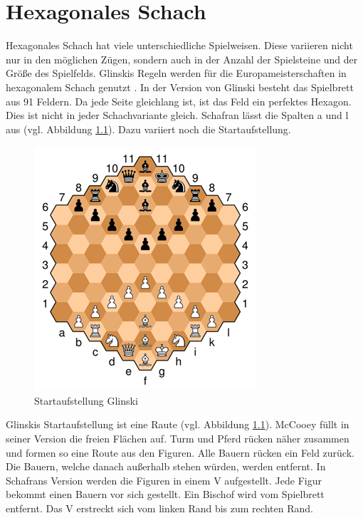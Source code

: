 \chapter{Hexagonales Schach}

Hexagonales Schach hat viele unterschiedliche Spielweisen. Diese variieren nicht nur in den möglichen Zügen, sondern auch in der Anzahl der Spielsteine und der Größe des Spielfelds. Glinskis Regeln werden für die Europameisterschaften in hexagonalem Schach genutzt \cite{Gados:Hexagonal}. In der Version von Glinski besteht das Spielbrett aus 91 Feldern. Da jede Seite gleichlang ist, ist das Feld ein perfektes Hexagon. Dies ist nicht in jeder Schachvariante gleich. Schafran lässt die Spalten a und l aus (vgl. Abbildung \ref{fig:hex:start}). Dazu variiert noch die Startaufstellung.

\begin{figure}[H]
    \centering
    \includegraphics{images/hexStart.png}
    \caption{Startaufstellung Glinski \protect\footnotemark}
    \label{fig:hex:start}
\end{figure}

Glinskis Startaufstellung ist eine Raute (vgl. Abbildung \ref{fig:hex:start}). McCooey füllt in seiner Version die freien Flächen auf. Turm und Pferd rücken näher zusammen und formen so eine Route aus den Figuren. Alle Bauern rücken ein Feld zurück. Die Bauern, welche danach außerhalb stehen würden, werden entfernt. In Schafrans Version werden die Figuren in einem V  aufgestellt. Jede Figur bekommt einen Bauern vor sich gestellt. Ein Bischof wird vom Spielbrett entfernt. Das V erstreckt sich vom linken Rand bis zum rechten Rand. \cite{GlinskiHexaChess}\cite{McCoeeyHexaChess}\cite{SchafranHexaChess}




